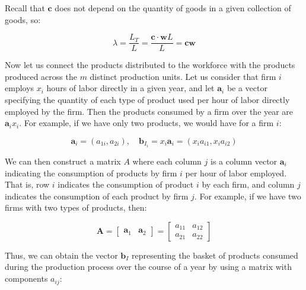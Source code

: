 Recall that $\boldsymbol{c}$ does not depend on the quantity of goods in a given collection of goods, so:


\begin{equation}
\lambda=\frac{L_{T}}{L}=\frac{\boldsymbol{c}\cdot\boldsymbol{w}L}{L}=\boldsymbol{c}\boldsymbol{w}
\end{equation}

Now let us connect the products distributed to the workforce with the products produced across the $m$ distinct production units. Let us consider that firm $i$ employs $x_{i}$ hours of labor directly in a given year, and let $\boldsymbol{a}_{i}$ be a vector specifying the quantity of each type of product used per hour of labor directly employed by the firm. Then the products consumed by a firm over the year are $\boldsymbol{a}_{i}x_{i}$. For example, if we have only two products, we would have for a firm $i$:


\begin{equation}
\boldsymbol{a}_{i}=\left(a_{1i},a_{2i}\right),\quad\boldsymbol{b}_{I_{i}}=x_{i}\boldsymbol{a}_{i}=\left(x_{i}a_{i1},x_{i}a_{i2}\right)
\end{equation}

We can then construct a matrix $A$ where each column $j$ is a column vector $\boldsymbol{a}_{i}$ indicating the consumption of products by firm $i$ per hour of labor employed. That is, row $i$ indicates the consumption of product $i$ by each firm, and column $j$ indicates the consumption of each product by firm $j$. For example, if we have two firms with two types of products, then:

\begin{equation}
\boldsymbol{A}=\left[\begin{array}{cc}
\boldsymbol{a}_{1} & \boldsymbol{a}_{2}\end{array}\right]=\left[\begin{array}{cc}
a_{11} & a_{12}\\
a_{21} & a_{22}
\end{array}\right]
\end{equation}

Thus, we can obtain the vector $\boldsymbol{b}_{I}$ representing the basket of products consumed during the production process over the course of a year by using a matrix with components $a_{ij}$:


